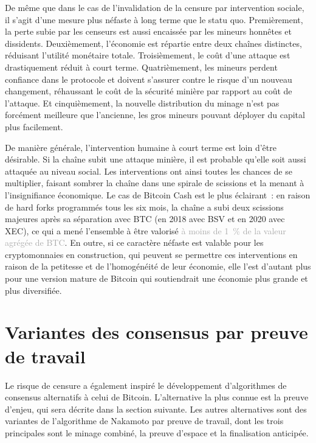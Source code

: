 De même que dans le cas de l'invalidation de la censure par intervention sociale, il s'agit d'une mesure plus néfaste à long terme que le statu quo. Premièrement, la perte subie par les censeurs est aussi encaissée par les mineurs honnêtes et dissidents. Deuxièmement, l'économie est répartie entre deux chaînes distinctes, réduisant l'utilité monétaire totale. Troisièmement, le coût d'une attaque est drastiquement réduit à court terme. Quatrièmement, les mineurs perdent confiance dans le protocole et doivent s'assurer contre le risque d'un nouveau changement, réhaussant le coût de la sécurité minière par rapport au coût de l'attaque. Et cinquièmement, la nouvelle distribution du minage n'est pas forcément meilleure que l'ancienne, les gros mineurs pouvant déployer du capital plus facilement.

De manière générale, l'intervention humaine à court terme est loin d'être désirable. Si la chaîne subit une attaque minière, il est probable qu'elle soit aussi attaquée au niveau social. Les interventions ont ainsi toutes les chances de se multiplier, faisant sombrer la chaîne dans une spirale de scissions et la menant à l'insignifiance économique. Le cas de Bitcoin Cash est le plus éclairant~: en raison de hard forks programmés tous les six mois, la chaîne a subi deux scissions majeures après sa séparation avec BTC (en 2018 avec BSV et en 2020 avec XEC), ce qui a mené l'ensemble à être valorisé \textcolor{darkgray}{à moins de 1~\% de la valeur agrégée de BTC}. En outre, si ce caractère néfaste est valable pour les cryptomonnaies en construction, qui peuvent se permettre ces interventions en raison de la petitesse et de l'homogénéité de leur économie, elle l'est d'autant plus pour une version mature de Bitcoin qui soutiendrait une économie plus grande et plus diversifiée.

\section*{Variantes des consensus par preuve de travail}

Le risque de censure a également inspiré le développement d'algorithmes de consensus alternatifs à celui de Bitcoin. L'alternative la plus connue est la preuve d'enjeu, qui sera décrite dans la section suivante. Les autres alternatives sont des variantes de l'algorithme de Nakamoto par preuve de travail, dont les trois principales sont le minage combiné, la preuve d'espace et la finalisation anticipée. %

